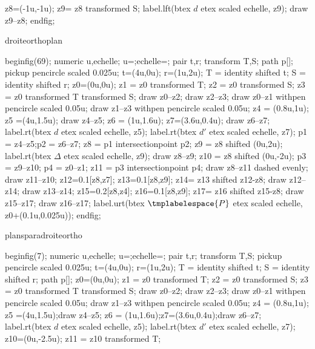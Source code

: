 {{{\begin{mplibcode}[PfLAM]
				z8=(-1u,-1u);
				z9= z8 transformed S;
				label.lft(btex $d$ etex scaled echelle, z9);
				draw z9--z8;
				endfig;
			\end{mplibcode}
		}%
		{droiteorthoplan}{%
			\begin{mplibcode}[PfLAN]
				beginfig(69);
				numeric u,echelle;
				u=\scaleminischemspace*1cm;echelle=\scaleminischemspace;
				pair t,r;
				transform T,S;
				path p[];
				pickup pencircle scaled 0.025u;
				t=(4u,0u); r=(1u,2u);
				T = identity shifted t;
				S = identity shifted r;
				z0=(0u,0u);
				z1 = z0 transformed T;
				z2 = z0 transformed S;
				z3 = z0 transformed T transformed S;
				draw z0--z2;
				draw z2--z3;
				draw z0--z1 withpen pencircle scaled 0.05u;
				draw z1--z3 withpen pencircle scaled 0.05u;
				z4 = (0.8u,1u);
				z5 =(4u,1.5u);
				draw z4--z5;
				z6 = (1u,1.6u);
				z7=(3.6u,0.4u);
				draw z6--z7;
				label.rt(btex $d$ etex scaled echelle, z5);
				label.rt(btex $d'$ etex scaled echelle, z7);
				p1 = z4--z5;p2 = z6--z7;
				z8 = p1 intersectionpoint p2;
				z9 = z8 shifted (0u,2u);
				label.rt(btex $\Delta$ etex scaled echelle, z9);
				draw z8--z9;
				z10 = z8 shifted (0u,-2u);
				p3 = z9--z10;
				p4 = z0--z1;
				z11 = p3 intersectionpoint p4;
				draw z8--z11 dashed evenly;
				draw z11--z10;
				z12=0.1[z8,z7];
				z13=0.1[z8,z9];
				z14= z13 shifted z12-z8;
				draw z12--z14;
				draw z13--z14;
				z15=0.2[z8,z4];
				z16=0.1[z8,z9];
				z17= z16 shifted z15-z8;
				draw z15--z17;
				draw z16--z17;
				label.urt(btex $\tmplabelespace{P}$ etex scaled echelle, z0+(0.1u,0.025u));
				endfig;
			\end{mplibcode}
		}%
		{plansparadroiteortho}{%
			\begin{mplibcode}[PfLAO]
				beginfig(7);
				numeric u,echelle;
				u=\scaleminischemspace*1cm;echelle=\scaleminischemspace;
				pair t,r;
				transform T,S;
				pickup pencircle scaled 0.025u;
				t=(4u,0u); r=(1u,2u);
				T = identity shifted t;
				S = identity shifted r;
				path p[];
				z0=(0u,0u);
				z1 = z0 transformed T;
				z2 = z0 transformed S;
				z3 = z0 transformed T transformed S;
				draw z0--z2;
				draw z2--z3;
				draw z0--z1 withpen pencircle scaled 0.05u;
				draw z1--z3 withpen pencircle scaled 0.05u;
				z4 = (0.8u,1u); z5 =(4u,1.5u);draw z4--z5;
				z6 = (1u,1.6u);z7=(3.6u,0.4u);draw z6--z7;
				label.rt(btex $d$ etex scaled echelle, z5);
				label.rt(btex $d'$ etex scaled echelle, z7);
				z10=(0u,-2.5u);
				z11 = z10 transformed T;

\end{mplibcode}}}}
